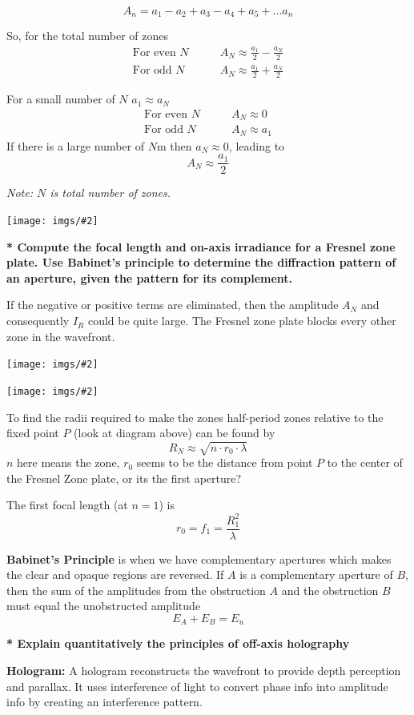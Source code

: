 \documentclass[10pt]{article}
\newcommand*{\pic}[2]{
    \begin{center}
        \texttt{[image: imgs/\#2]}
    \end{center}
}
\newcommand*{\lo}[1]{
    \textbf{* #1} \newline
}
\begin{document}
\[A_n = a_1 - a_2 + a_3 - a_4 +a_5 + ... a_n\]

So, for the total number of zones
\begin{align*}
    \text{For even $N$} \qquad & A_N \approx \frac{a_1}{2} - \frac{a_N}{2} \\
    \text{For odd $N$} \qquad & A_N \approx \frac{a_1}{2} + \frac{a_N}{2}
\end{align*}

For a small number of $N$ $a_1 \approx a_N$
\begin{align*}
    \text{For even $N$} \qquad & A_N \approx 0 \\
    \text{For odd $N$} \qquad & A_N \approx a_1 
\end{align*}
If there is a large number of $N$m then $a_N \approx 0$, leading to 
\[A_N \approx \frac{a_1}{2}\]

\textit{Note: $N$ is total number of zones.}

\newblock

\pic{.6}{circ-approx.png}
\newpage
\lo{Compute the focal length and on-axis irradiance for a Fresnel zone plate. Use Babinet’s principle to determine the diffraction pattern of an aperture, given the pattern for its complement.}

If the negative or positive terms are eliminated, then the amplitude $A_N$ and consequently $I_R$ could be quite large. The Fresnel zone plate blocks every other zone in the wavefront.

\pic{.7}{plate.png} \pic{.7}{plate-def.png}

To find the radii required to make the zones half-period zones relative to the fixed point $P$ (look at diagram above) can be found by 
\[R_N \approx \sqrt{n \cdot r_0 \cdot \lambda}\]
$n$ here means the zone, $r_0$ seems to be the distance from point $P$ to the center of the Fresnel Zone plate, or its the first aperture?

\newblock

The first focal length (at $n = 1$) is 
\[r_0 = f_1 = \frac{R_1^2}{\lambda}\]

\textbf{Babinet's Principle} is when we have complementary apertures which makes the clear and opaque regions are reversed. If $A$ is a complementary aperture of $B$, then the sum of the amplitudes from the obstruction $A$ and the obstruction $B$ must equal the unobstructed amplitude
\[E_A + E_B = E_u\]

\newpage

\lo{Explain quantitatively the principles of off-axis holography}
\textbf{Hologram:} A hologram reconstructs the wavefront to provide depth perception and parallax. It uses interference of light to convert phase info into amplitude info by creating an interference pattern.
\end{document}
